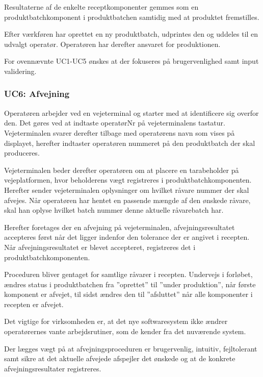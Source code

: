 \documentclass[a4paper]{article}
\begin{document}
Resultaterne af de enkelte receptkomponenter gemmes som en produktbatchkomponent i produktbatchen samtidig med at produktet fremstilles.

Efter værkføren har oprettet en ny produktbatch, udprintes den og uddeles til en udvalgt operatør. Operatøren har derefter ansvaret for produktionen. 

For ovennævnte UC1-UC5 ønskes at der fokuseres på brugervenlighed samt input validering.


\subsubsection{UC6: Afvejning} %

Operatøren arbejder ved en vejeterminal og starter med at identificere sig overfor den. Det gøres ved at indtaste operatørNr på vejeterminalens tastatur. Vejeterminalen svarer derefter tilbage med operatørens navn som vises på displayet, herefter indtaster operatøren nummeret på den produktbatch der skal produceres.

Vejeterminalen beder derefter operatøren om at placere en tarabeholder på vejeplatformen, hvor beholderens vægt registreres i produktbatchkomponenten. Herefter sender vejeterminalen oplysninger om hvilket råvare nummer der skal afvejes. Når operatøren har hentet en passende mængde af den ønskede råvare, skal han oplyse hvilket batch nummer denne aktuelle råvarebatch har.

Herefter foretages der en afvejning på vejeterminalen, afvejningsresultatet accepteres først når det ligger indenfor den tolerance der er angivet i recepten. Når afvejningsresultatet er blevet accepteret, registreres det i produktbatchkomponenten. 

Proceduren bliver gentaget for samtlige råvarer i recepten. Undervejs i forløbet, ændres status i produktbatchen fra ”oprettet” til ”under produktion”, når første komponent er afvejet, til sidst ændres den til ”afsluttet” når alle komponenter i recepten er afvejet.

Det vigtige for virksomheden er, at det nye softwaresystem ikke ændrer operatørernes vante arbejdsrutiner, som de kender fra det nuværende system.

Der lægges vægt på at afvejningsproceduren er brugervenlig, intuitiv, fejltolerant samt sikre at det aktuelle afvejede afspejler det ønskede og at de konkrete afvejningsresultater registreres.
\end{document}
